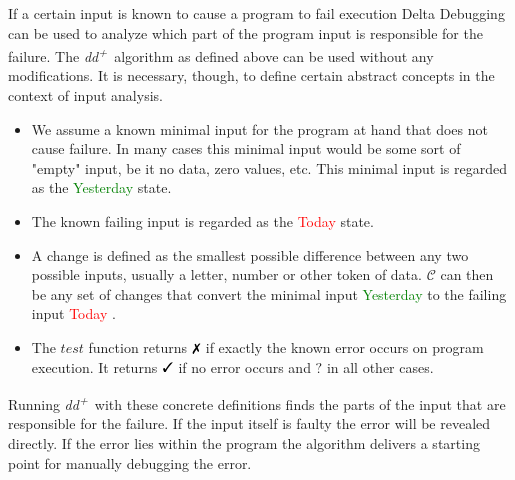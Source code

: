 \documentclass[a4paper,UKenglish]{lipics-v2018}
\newcommand{\ddp}{\textit{dd\textsuperscript{+}}}
\newcommand{\green}[1]{\textcolor{green}{#1}}
\newcommand{\red}[1]{\textcolor{red}{#1}}
\newcommand{\yd}[0]{\green{Yesterday} }
\newcommand{\td}[0]{\red{Today} }
\newcommand{\C}[0]{\ensuremath{\mathcal{C}}}
\newcommand{\cmark}{\text{\ding{51}}}
\newcommand{\xmark}{\text{\ding{55}}}
\newcommand{\qmark}{\textbf{?}}
\begin{document}
If a certain input is known to cause a program to fail execution Delta Debugging can be used to analyze which part of the program input is responsible for the failure. The \ddp\ algorithm as defined above can be used without any modifications. It is necessary, though, to define certain abstract concepts in the context of input analysis.\\
\begin{itemize}
  	\item We assume a known minimal input for the program at hand that does not cause failure. In many cases this minimal input would be some sort of "empty" input, be it no data, zero values, etc. This minimal input is regarded as the \yd state.
  	\item The known failing input is regarded as the \td state.
  	\item A change is defined as the smallest possible difference between any two possible inputs, usually a letter, number or other token of data. $\C$ can then be any set of changes that convert the minimal input \yd to the failing input \td.
  	\item The $test$ function returns $\xmark$ if exactly the known error occurs on program execution. It returns $\cmark$ if no error occurs and $\qmark$ in all other cases. 
\end{itemize}

Running \ddp\ with these concrete definitions finds the parts of the input that are responsible for the failure. If the input itself is faulty the error will be revealed directly. If the error lies within the program the algorithm delivers a starting point for manually debugging the error.
\end{document}
